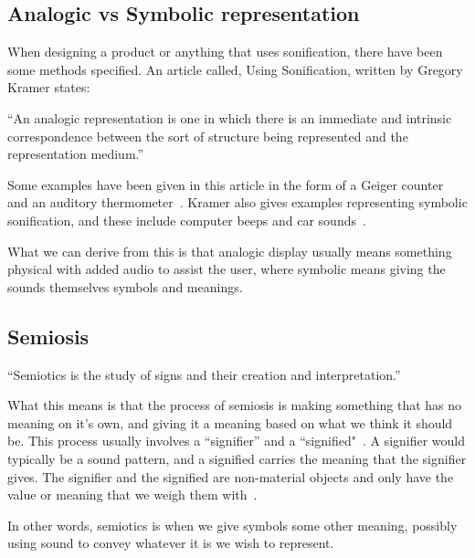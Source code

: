 

\FloatBarrier
\subsection{Analogic vs Symbolic representation} %
\label{sub:analogic_vs_symbolic_representation}

When designing a product or anything that uses sonification, there have been some methods specified. An article called, Using Sonification, written by Gregory Kramer states:

\enquote{An analogic representation is one in which there is an immediate and intrinsic correspondence between the sort of structure being represented and the representation medium.}~\cite*[pp.26]{Barrass1999}

Some examples have been given in this article in the form of a Geiger counter and an auditory thermometer~\cite*[pp.26]{Barrass1999}.
Kramer also gives examples representing symbolic sonification, and these include computer beeps and car sounds~\cite*[pp.26]{Barrass1999}.

What we can derive from this is that analogic display usually means something physical with added audio to assist the user, where symbolic means giving the sounds themselves symbols and meanings.


\FloatBarrier
\subsection{Semiosis} %
\label{sub:semiosis}


\enquote{Semiotics is the study of signs and their creation and interpretation.}~\cite*{Chandler2007}

What this means is that the process of semiosis is making something that has no meaning on it’s own, and giving it a meaning based on what we think it should be. This process usually involves a “signifier” and a “signified"~\cite*{Chandler2007}.
A signifier would typically be a sound pattern, and a signified carries the meaning that the signifier gives. The signifier and the signified are non-material objects and only have the value or meaning that we weigh them with~\cite*{Chandler2007}.

In other words, semiotics is when we give symbols some other meaning, possibly using sound to convey whatever it is we wish to represent. 

